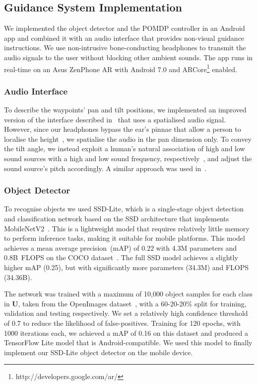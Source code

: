 \documentclass[runningheads]{llncs}
\begin{document}
\subsection{Guidance System Implementation}

We implemented the object detector and the POMDP controller in an Android app and combined it with an audio interface that provides non-visual guidance instructions.
We use non-intrusive bone-conducting headphones to transmit the audio signals to the user without blocking other ambient sounds.
The app runs in real-time on an Asus ZenPhone AR with Android 7.0 and ARCore\footnote{http://developers.google.com/ar/} enabled.

\subsubsection{Audio Interface}
To describe the waypoints' pan and tilt positions, we implemented an improved version of the interface described in~\cite{bellotto2013} that uses a spatialised audio signal.
However, since our headphones bypass the ear's pinnae that allow a person to localise the height~\cite{roffler1968factors}, we spatialise the audio in the pan dimension only.
To convey the tilt angle, we instead exploit a human's natural association of high and low sound sources with a high and low sound frequency, respectively~\cite{blauert1997spatial}, and adjust the sound source's pitch accordingly. 
A similar approach was used in~\cite{schauerte2012assistive}.

\subsubsection{Object Detector}
To recognise objects we used SSD-Lite, which is a single-stage object detection and classification network based on the SSD architecture that implements MobileNetV2~\cite{sandler2018mobilenetv2}.
This is a lightweight model that requires relatively little memory to perform inference tasks, making it suitable for mobile platforms. 
This model achieves a mean average precision~(mAP) of 0.22 with 4.3M parameters and 0.8B~FLOPS on the COCO dataset~\cite{li2018tinydsod}.
The full SSD model achieves a slightly higher mAP (0.25), but with significantly more parameters (34.3M) and FLOPS (34.36B).

The network was trained with a maximum of 10,000 object samples for each class in $\mathbf{U}$, taken from the OpenImages dataset~\cite{openimages}, with a 60-20-20\% split for training, validation and testing respectively.
We set a relatively high confidence threshold of 0.7 to reduce the likelihood of false-positives.
Training for 120 epochs, with 1000 iterations each, we achieved a mAP of 0.16 on this dataset and produced a TensorFlow Lite model that is Android-compatible. We used this model to finally implement our SSD-Lite object detector on the mobile device.
\end{document}

